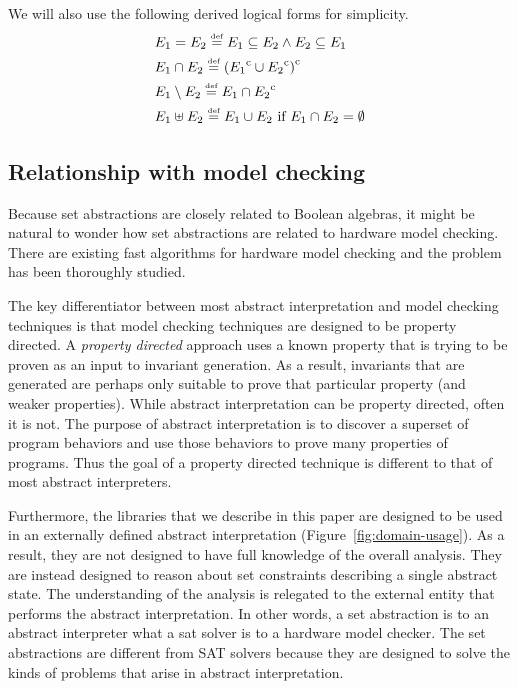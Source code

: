 We will also use the following derived logical forms for simplicity.
\begin{align*}
 & E_1 = E_2 \stackrel{\textrm{\tiny def}}{=} E_1 \subseteq E_2 \wedge E_2 \subseteq E_1 \\
 & E_1 \cap E_2 \stackrel{\textrm{\tiny def}}{=} {({E_1}^{\mathrm{c}} \cup {E_2}^{\mathrm{c}})}^{\mathrm{c}} \\
 & E_1 \setminus E_2 \stackrel{\textrm{\tiny def}}{=} E_1 \cap {E_2}^{\mathrm{c}} \\
 & E_1 \uplus E_2 \stackrel{\textrm{\tiny def}}{=} E_1 \cup E_2 \textrm{ if } E_1 \cap E_2 = \emptyset
\end{align*}

\subsection{Relationship with model checking}

Because set abstractions are closely related to Boolean algebras, it might be natural to wonder how set abstractions are related to hardware model checking.  There are existing fast algorithms for hardware model checking and the problem has been thoroughly studied.

The key differentiator between most abstract interpretation and model checking techniques is that model checking techniques are designed to be property directed.  A \emph{property directed} approach uses a known property that is trying to be proven as an input to invariant generation.  As a result, invariants that are generated are perhaps only suitable to prove that particular property (and weaker properties).  While abstract interpretation can be property directed, often it is not.  The purpose of abstract interpretation is to discover a superset of program behaviors and use those behaviors to prove many properties of programs.  Thus the goal of a property directed technique is different to that of most abstract interpreters.

Furthermore, the libraries that we describe in this paper are designed to be used in an externally defined abstract interpretation (Figure~\ref{fig:domain-usage}).  As a result, they are not designed to have full knowledge of the overall analysis.  They are instead designed to reason about set constraints describing a single abstract state.  The understanding of the analysis is relegated to the external entity that performs the abstract interpretation.  In other words, a set abstraction is to an abstract interpreter what a sat solver is to a hardware model checker.  The set abstractions are different from SAT solvers because they are designed to solve the kinds of problems that arise in abstract interpretation.

